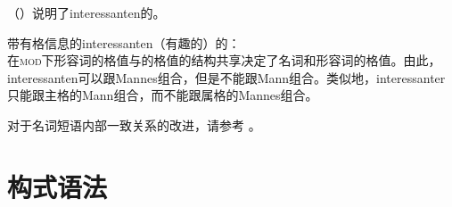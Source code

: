 \begin{enumerate}
\eal
{}
\zl
（）说明了interessanten的\catvc 。 

\eas
带有格信息的interessanten（有趣的）的\catvc  ：\\
\zs
在\textsc{mod}下形容词的格值与\nbar 的格值的结构共享决定了名词和形容词的格值。由此，interessanten可以跟Mannes组合，但是不能跟Mann组合。类似地，interessanter只能跟主格的Mann组合，而不能跟属格的Mannes组合。

对于名词短语内部一致关系的改进，请参考 。
\end{enumerate}


\section{构式语法}


